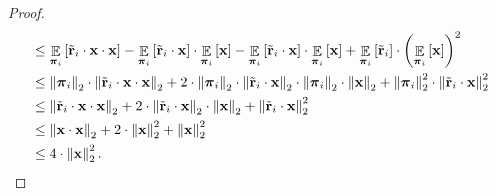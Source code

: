 \documentclass[10pt]{article}
\def\rvx{{\mathbf{x}}}
\def\rvtilder{{\tilde{\mathbf{r}}}}
\def\rvpi{{\boldsymbol{\pi}}}
\def\sE{{\mathbb{E}}}
\DeclareMathOperator*{\expectation}{\sE}
\begin{document}
\begin{proof}
\begin{equation*}
\begin{split}
    &\le \expectation\limits_{\rvpi_i}\left[ \rvtilder_i \cdot \rvx \cdot \rvx \right] - \expectation\limits_{\rvpi_i}\left[ \rvtilder_i \cdot \rvx \right] \cdot \expectation\limits_{\rvpi_i}\left[ \rvx \right] - \expectation\limits_{\rvpi_i}\left[ \rvtilder_i \cdot \rvx \right] \cdot \expectation\limits_{\rvpi_i}\left[ \rvx \right] + \expectation\limits_{\rvpi_i}\left[ \rvtilder_i \right] \cdot \left( \expectation\limits_{\rvpi_i}\left[ \rvx \right] \right)^2 \\
    &\le \left\| \rvpi_i \right\|_2 \cdot \left\| \rvtilder_i \cdot \rvx \cdot \rvx \right\|_2 + 2 \cdot \left\| \rvpi_i \right\|_2 \cdot \left\| \rvtilder_i \cdot \rvx \right\|_2 \cdot \left\| \rvpi_i \right\|_2 \cdot \left\| \rvx \right\|_2 + \left\| \rvpi_i \right\|_2^2 \cdot \left\| \rvtilder_i \cdot \rvx \right\|_2^2 \\
    &\le \left\| \rvtilder_i \cdot \rvx \cdot \rvx \right\|_2 + 2 \cdot \left\| \rvtilder_i \cdot \rvx \right\|_2 \cdot \left\| \rvx \right\|_2 + \left\| \rvtilder_i \cdot \rvx \right\|_2^2 \\
    &\le \left\| \rvx \cdot \rvx \right\|_2 + 2 \cdot \left\| \rvx \right\|_2^2 + \left\| \rvx \right\|_2^2 \\
    &\le 4 \cdot \left\| \rvx \right\|_2^2. \qedhere
\end{split}
\end{equation*}
\end{proof}
\end{document}
